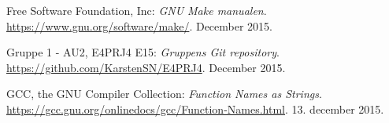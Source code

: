 \begin{thebibliography}{2}
 Free Software Foundation, Inc: \textit{GNU Make manualen}. \\
\url{https://www.gnu.org/software/make/}. December 2015.

 Gruppe 1 - AU2, E4PRJ4 E15: \textit{Gruppens Git repository}. \\
\url{https://github.com/KarstenSN/E4PRJ4}. December 2015.

 GCC, the GNU Compiler Collection: \textit{Function Names as Strings}. \\
\url{https://gcc.gnu.org/onlinedocs/gcc/Function-Names.html}. 13. december 2015.


\end{thebibliography}